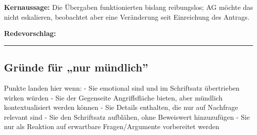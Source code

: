 \documentclass[
  11pt,
  a4paper,
]{article}
\begin{document}
\textbf{Kernaussage:} Die Übergaben funktionierten bislang reibungslos;
AG möchte das nicht eskalieren, beobachtet aber eine Veränderung seit
Einreichung des Antrags.

\textbf{Redevorschlag:}

\begin{center}\rule{0.5\linewidth}{0.5pt}\end{center}

\subsection{Gründe für „nur
mündlich''}\label{gruxfcnde-fuxfcr-nur-muxfcndlich}

Punkte landen hier wenn: - Sie emotional sind und im Schriftsatz
übertrieben wirken würden - Sie der Gegenseite Angriffsfläche bieten,
aber mündlich kontextualisiert werden können - Sie Details enthalten,
die nur auf Nachfrage relevant sind - Sie den Schriftsatz aufblähen,
ohne Beweiswert hinzuzufügen - Sie nur als Reaktion auf erwartbare
Fragen/Argumente vorbereitet werden
\end{document}
